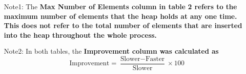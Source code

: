 \documentclass[11pt]{amsart}
\begin{document}
\vspace{8mm}
Note1: The \bf Max Number of Elements \rm column in table 2 refers to the maximum number of elements that the heap holds at any one time. This does \bf not \rm refer to the total number of elements that are inserted into the heap throughout the whole process.

\vspace{4mm}
Note2: In both tables, the \bf Improvement \rm column was calculated as 
\[
	\text{Improvement} = \frac{\text{Slower} - \text{Faster}}{\text{Slower}} \times 100
\]
\end{document}
